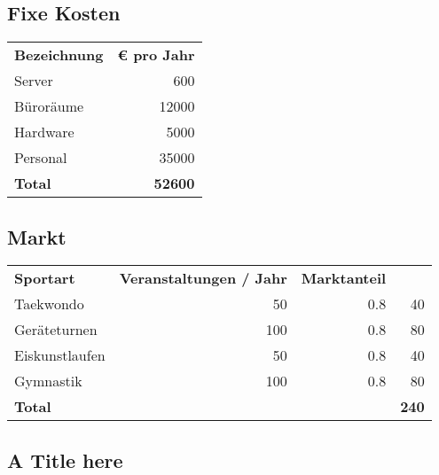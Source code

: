 \subsection{Fixe Kosten}

\begin{table}[H]

    \begin{tabular}{l r}
        \textbf{Bezeichnung}    & \textbf{€ pro Jahr}\\
        Server                  & 600\\
        Büroräume               & 12000\\
        Hardware                & 5000\\
        Personal                & 35000\\
        \midrule
        \textbf{Total}          & \textbf{52600}
    \end{tabular}
    \label{tab:Fixkosten}
\end{table}

\subsection{Markt}

\begin{table}[H]

    \begin{tabular}{l r r r}
        \textbf{Sportart}       & \textbf{Veranstaltungen / Jahr}   & \textbf{Marktanteil}      &  \\
        Taekwondo               & 50                                & 0.8                       & 40\\
        Geräteturnen            & 100                               & 0.8                       & 80\\
        Eiskunstlaufen          & 50                                & 0.8                       & 40\\
        Gymnastik               & 100                               & 0.8                       & 80\\
        \midrule
        \textbf{Total}          &                                   &                           & \textbf{240}
    \end{tabular}
    \label{tab:Markt}
\end{table}

\subsection{A Title here}

